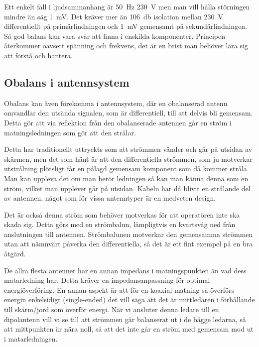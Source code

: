 Ett enkelt fall i ljudsammanhang är \qty{50}{\hertz} \qty{230}{\volt} men man
vill hålla störningen mindre än säg \qty{1}{\milli\volt}.
Det kräver mer än \qty{106}{\decibel} isolation mellan \qty{230}{\volt}
differentiellt på primärlindningen och \qty{1}{\milli\volt} gemensamt på
sekundärlindningen.
Så god balans kan vara svår att finna i enskilda komponenter.
Principen återkommer oavsett spänning och frekvens, det är en brist
man behöver lära sig att förstå och hantera.

\subsection{Obalans i antennsystem}
\label{obalans_antennsystem}

Obalans kan även förekomma i antennsystem, där en obalanserad antenn omvandlar
den utsända signalen, som är differentiell, till att delvis bli gemensam.
Detta gör att via reflektion från den obalanserade antennen går en ström i
matningsledningen som gör att den strålar.

Detta har traditionellt uttryckts som att strömmen vänder och går på utsidan av
skärmen, men det som hänt är att den differentiella strömmen, som ju motverkar
utstrålning plötsligt får en pålagd gemensam komponent som då kommer stråla.
Man kan uppleva det om man berör ledningen så kan man känna denna som en ström,
vilket man upplever går på utsidan.
Kabeln har då blivit en strålande del av antennen, något som för vissa
antenntyper är en medveten design.

Det är också denna ström som behöver motverkas för att operatören inte ska
skada sig.
Detta görs med en strömbalun, lämpligtvis en kvartsvåg ned från anslutningen
till antennen.
Strömbalunen motverkar den gemensamma strömmen utan att nämnvärt påverka
den differentiella, så det är ett fint exempel på en bra åtgärd.

De allra flesta antenner har en annan impedans i matningspunkten än vad dess
matarledning har.
Detta kräver en impedansanpassning för optimal energiöverföring.
En annan aspekt är att för en koaxial matning så överförs energin enkelsidigt
(single-ended) det vill säga att det är mittledaren i förhållande till
skärm/jord som överför energi.
När vi ansluter denna ledare till en dipolantenn vill vi se till att strömmen
går balanserat ut i de bägge ledarna, så att mittpunkten är nära noll, så att
det inte går en ström med gemensam mod ut i matarledningen.

